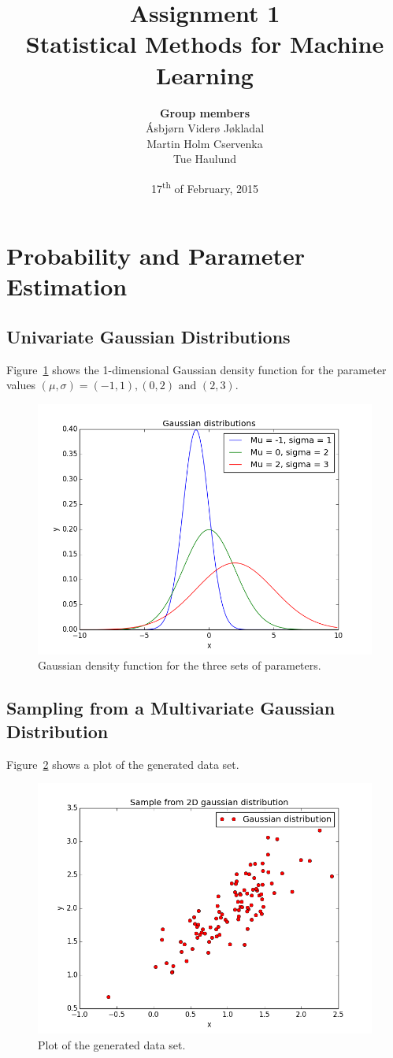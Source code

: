 \documentclass[a4paper]{article}
\title{\textbf{Assignment 1} \\ \small Statistical Methods for Machine Learning }
\author{\textbf{Group members}\\
        Ásbjørn Viderø Jøkladal\\
        Martin Holm Cservenka\\
        Tue Haulund}
\date{17\textsuperscript{th} of February, 2015}
\begin{document}
\maketitle
\tableofcontents
\newpage

\section{Probability and Parameter Estimation}
\subsection{Univariate Gaussian Distributions}
Figure~\ref{fig:distributions} shows the 1-dimensional Gaussian density function for the parameter values $(\mu, \sigma) = (-1, 1), (0, 2) \text{ and } (2, 3)$.

\begin{figure}[H]
  \centering
  \includegraphics[width=.7\linewidth]{figures/distributions.png}
  \caption{Gaussian density function for the three sets of parameters.}
  \label{fig:distributions}
\end{figure}

\subsection{Sampling from a Multivariate Gaussian Distribution}
Figure~\ref{fig:samples} shows a plot of the generated data set.

\begin{figure}[H]
  \centering
  \includegraphics[width=.7\linewidth]{figures/samples.png}
  \caption{Plot of the generated data set.}
  \label{fig:samples}
\end{figure}
\end{document}
